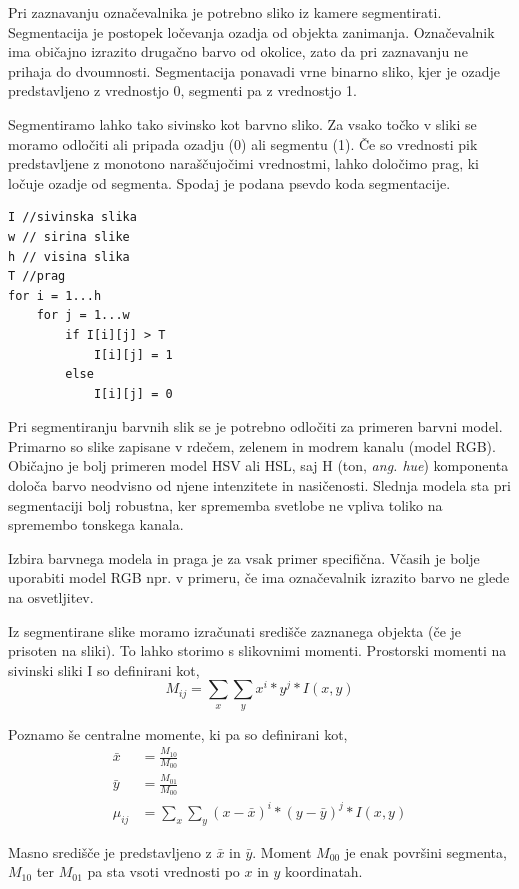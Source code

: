 \documentclass[a4paper, 12pt]{book}
\begin{document}
Pri zaznavanju označevalnika je potrebno sliko iz kamere segmentirati. Segmentacija je postopek ločevanja ozadja od objekta zanimanja. Označevalnik ima običajno izrazito drugačno barvo od okolice, zato da pri zaznavanju ne prihaja do dvoumnosti. Segmentacija ponavadi vrne binarno sliko, kjer je ozadje predstavljeno z vrednostjo 0, segmenti pa z vrednostjo 1. 

Segmentiramo lahko tako sivinsko kot barvno sliko. Za vsako točko v sliki se moramo odločiti ali pripada ozadju (0) ali segmentu (1). Če so vrednosti pik predstavljene z monotono naraščujočimi vrednostmi, lahko določimo prag, ki ločuje ozadje od segmenta. Spodaj je podana psevdo koda segmentacije.
\begin{lstlisting}
I //sivinska slika
w // sirina slike
h // visina slika
T //prag
for i = 1...h
    for j = 1...w
        if I[i][j] > T
            I[i][j] = 1
        else
            I[i][j] = 0
\end{lstlisting}

Pri segmentiranju barvnih slik se je potrebno odločiti za primeren barvni model. Primarno so slike zapisane v rdečem, zelenem in modrem kanalu (model RGB). Običajno je bolj primeren model HSV ali HSL, saj H (ton, \emph{ang. hue}) komponenta določa barvo neodvisno od njene intenzitete in nasičenosti. Slednja modela sta pri segmentaciji bolj robustna, ker sprememba svetlobe ne vpliva toliko na spremembo tonskega kanala.

Izbira barvnega modela in praga je za vsak primer specifična. Včasih je bolje uporabiti model RGB npr. v primeru, če ima označevalnik izrazito barvo ne glede na osvetljitev.

Iz segmentirane slike moramo izračunati središče zaznanega objekta (če je prisoten na sliki). To lahko storimo s slikovnimi momenti. Prostorski momenti na sivinski sliki I so definirani kot,
\begin{equation}
M_{ij} = \sum_x \sum_y x^i * y^j * I(x, y)
\end{equation}

Poznamo še centralne momente, ki pa so definirani kot,
\begin{align}
\bar{x} &= \frac{M_{10}}{M_{00}} \\
\bar{y} &= \frac{M_{01}}{M_{00}} \\
\mu_{ij} &= \sum_x \sum_y (x - \bar{x})^i * (y - \bar{y})^j * I(x, y)
\end{align}

Masno središče je predstavljeno z $\bar{x}$ in $\bar{y}$. Moment $M_{00}$ je enak površini segmenta, $M_{10}$ ter $M_{01}$ pa sta vsoti vrednosti po $x$ in $y$ koordinatah.
\end{document}
